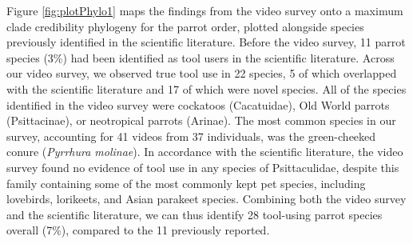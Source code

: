 \documentclass[
  man,floatsintext]{apa6}
\begin{document}
Figure \ref{fig:plotPhylo1} maps the findings from the video survey onto a maximum clade credibility phylogeny for the parrot order, plotted alongside species previously identified in the scientific literature. Before the video survey, 11 parrot species (3\%) had been identified as tool users in the scientific literature. Across our video survey, we observed true tool use in 22 species, 5 of which overlapped with the scientific literature and 17 of which were novel species. All of the species identified in the video survey were cockatoos (Cacatuidae), Old World parrots (Psittacinae), or neotropical parrots (Arinae). The most common species in our survey, accounting for 41 videos from 37 individuals, was the green-cheeked conure (\emph{Pyrrhura molinae}). In accordance with the scientific literature, the video survey found no evidence of tool use in any species of Psittaculidae, despite this family containing some of the most commonly kept pet species, including lovebirds, lorikeets, and Asian parakeet species. Combining both the video survey and the scientific literature, we can thus identify 28 tool-using parrot species overall (7\%), compared to the 11 previously reported.
\end{document}

